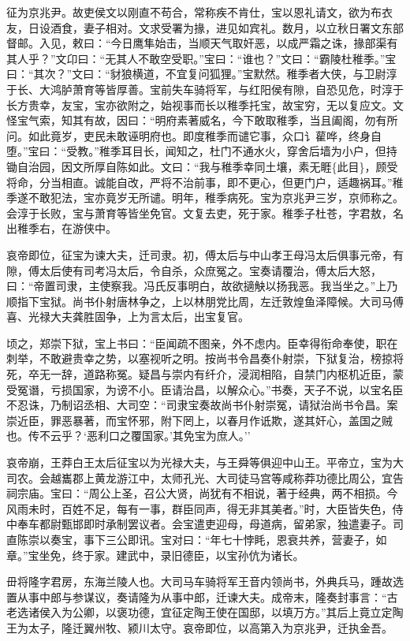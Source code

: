 \documentclass[]{article}
\begin{document}
征为京兆尹。故吏侯文以刚直不苟合，常称疾不肯仕，宝以恩礼请文，欲为布衣友，日设酒食，妻子相对。文求受署为掾，进见如宾礼。数月，以立秋日署文东部督邮。入见，敕曰：``今日鹰隼始击，当顺天气取奸恶，以成严霜之诛，掾部渠有其人乎？''文卬曰：``无其人不敢空受职。''宝曰：``谁也？''文曰：``霸陵杜稚季。''宝曰：``其次？''文曰：``豺狼横道，不宜复问狐狸。''宝默然。稚季者大侠，与卫尉淳于长、大鸿胪萧育等皆厚善。宝前失车骑将军，与红阳侯有隙，自恐见危，时淳于长方贵幸，友宝，宝亦欲附之，始视事而长以稚季托宝，故宝穷，无以复应文。文怪宝气索，知其有故，因曰：``明府素著威名，今下敢取稚季，当且阖阁，勿有所问。如此竟岁，吏民未敢诬明府也。即度稚季而谴它事，众口讠雚哗，终身自堕。''宝曰：``受教。''稚季耳目长，闻知之，杜门不通水火，穿舍后墙为小户，但持锄自治园，因文所厚自陈如此。文曰：``我与稚季幸同土壤，素无睚\{此目\}，顾受将命，分当相直。诚能自改，严将不治前事，即不更心，但更门户，适趣祸耳。''稚季遂不敢犯法，宝亦竟岁无所谴。明年，稚季病死。宝为京兆尹三岁，京师称之。会淳于长败，宝与萧育等皆坐免官。文复去吏，死于家。稚季子杜苍，字君敖，名出稚季右，在游侠中。

哀帝即位，征宝为谏大夫，迁司隶。初，傅太后与中山孝王母冯太后俱事元帝，有隙，傅太后使有司考冯太后，令自杀，众庶冤之。宝奏请覆治，傅太后大怒，曰：``帝置司隶，主使察我。冯氏反事明白，故欲擿觖以扬我恶。我当坐之。''上乃顺指下宝狱。尚书仆射唐林争之，上以林朋党比周，左迁敦煌鱼泽障候。大司马傅喜、光禄大夫龚胜固争，上为言太后，出宝复官。

顷之，郑崇下狱，宝上书曰：``臣闻疏不图亲，外不虑内。臣幸得衔命奉使，职在刺举，不敢避贵幸之势，以塞视听之明。按尚书令昌奏仆射崇，下狱复治，榜掠将死，卒无一辞，道路称冤。疑昌与崇内有纤介，浸润相陷，自禁门内枢机近臣，蒙受冤谮，亏损国家，为谤不小。臣请治昌，以解众心。''书奏，天子不说，以宝名臣不忍诛，乃制诏丞相、大司空：``司隶宝奏故尚书仆射崇冤，请狱治尚书令昌。案崇近臣，罪恶暴著，而宝怀邪，附下罔上，以春月作诋欺，遂其奸心，盖国之贼也。传不云乎？`恶利口之覆国家。'其免宝为庶人。''

哀帝崩，王莽白王太后征宝以为光禄大夫，与王舜等俱迎中山王。平帝立，宝为大司农。会越巂郡上黄龙游江中，太师孔光、大司徒马宫等咸称莽功德比周公，宜告祠宗庙。宝曰：``周公上圣，召公大贤，尚犹有不相说，著于经典，两不相损。今风雨未时，百姓不足，每有一事，群臣同声，得无非其美者。''时，大臣皆失色，侍中奉车都尉甄邯即时承制罢议者。会宝遣吏迎母，母道病，留弟家，独遣妻子。司直陈崇以奏宝，事下三公即讯。宝对曰：``年七十悖眊，恩衰共养，营妻子，如章。''宝坐免，终于家。建武中，录旧德臣，以宝孙伉为诸长。

毌将隆字君房，东海兰陵人也。大司马车骑将军王音内领尚书，外典兵马，踵故选置从事中郎与参谋议，奏请隆为从事中郎，迁谏大夫。成帝末，隆奏封事言：``古老选诸侯入为公卿，以褒功德，宜征定陶王使在国邸，以填万方。''其后上竟立定陶王为太子，隆迁翼州牧、颍川太守。哀帝即位，以高第入为京兆尹，迁执金吾。
\end{document}
